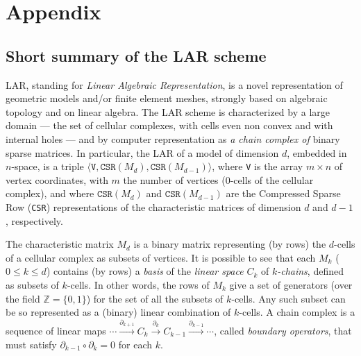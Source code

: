 \appendix
\section{Appendix}
\subsection{Short summary of the LAR scheme}\label{sec:lar}

LAR, standing for \emph{Linear Algebraic Representation}, is a novel representation of geometric models and/or finite element meshes, strongly based on algebraic topology and on linear algebra. The LAR scheme is characterized by a large domain --- the set of cellular complexes, with cells even non convex and with internal holes --- and by computer representation as \emph{a chain complex of} binary sparse matrices. In particular, the LAR of a model of dimension $d$, embedded in $n$-space, is a triple $\langle \texttt{V}, \texttt{CSR}(M_d), \texttt{CSR}(M_{d-1}) \rangle$, where 
\texttt{V} is the array $m\times n$ of vertex coordinates, with $m$ the number of vertices (0-cells of the cellular complex), and where 
$\texttt{CSR}(M_d)$ and $\texttt{CSR}(M_{d-1})$ are the Compressed Sparse Row (\texttt{CSR}) representations of the characteristic matrices of dimension $d$ and $d-1$, respectively.  

The characteristic matrix $M_d$ is a binary matrix representing (by rows) the $d$-cells of a cellular complex as subsets of vertices. It is possible to see that each $M_k$ ($0\leq k\leq d$) contains (by rows) a \emph{basis} of the \emph{linear space} $C_k$ of \emph{$k$-chains}, defined as subsets of $k$-cells. In other words, the rows of $M_k$ give a set of generators (over the field $\mathbb{Z} = \{0,1\}$) for the set of all the subsets of $k$-cells. Any such subset can be so represented as a (binary) linear combination of $k$-cells.
A chain complex is a sequence of linear maps $ \cdots \xrightarrow{\partial_{k+1}} C_k \xrightarrow{\partial_k} C_{k-1} \xrightarrow{\partial_{k-1}} \cdots $, called \emph{boundary operators}, that must satisfy $\partial_{k-1} \circ \partial_k=0$ for each $k$.

